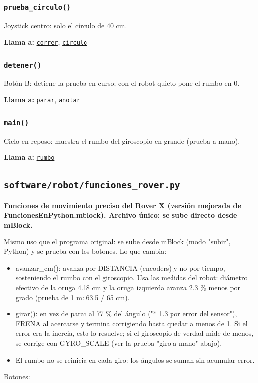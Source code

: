 \subsubsection{\texttt{prueba\_\allowbreak{}circulo()}}\label{fn:calibrations:prueba-circulo}
\noindent Joystick centro: solo el círculo de 40 cm.

\noindent\textbf{Llama a:} \hyperref[fn:calibrations:correr]{\texttt{correr}}, \hyperref[fn:calibrations:circulo]{\texttt{circulo}}\par

\subsubsection{\texttt{detener()}}\label{fn:calibrations:detener}
\noindent Botón B: detiene la prueba en curso; con el robot quieto pone el rumbo en 0.

\noindent\textbf{Llama a:} \hyperref[fn:calibrations:parar]{\texttt{parar}}, \hyperref[fn:calibrations:anotar]{\texttt{anotar}}\par

\subsubsection{\texttt{main()}}\label{fn:calibrations:main}
\noindent Ciclo en reposo: muestra el rumbo del giroscopio en grande (prueba a mano).

\noindent\textbf{Llama a:} \hyperref[fn:calibrations:rumbo]{\texttt{rumbo}}\par

\subsection{\texttt{software/robot/funciones\_\allowbreak{}rover.py}}\label{mod:funciones-rover}
\textbf{Funciones de movimiento preciso del Rover X (versión mejorada de FuncionesEnPython.mblock). Archivo único: se sube directo desde mBlock.}

Mismo uso que el programa original: se sube desde mBlock (modo "subir", Python) y se prueba con los botones. Lo que cambia:

\begin{itemize}\setlength\itemsep{0pt}
\item avanzar\_cm(): avanza por DISTANCIA (encoders) y no por tiempo, sosteniendo el rumbo con el giroscopio. Usa las medidas del robot: diámetro efectivo de la oruga 4.18 cm y la oruga izquierda avanza 2.3 \% menos por grado (prueba de 1 m: 63.5 / 65 cm).
\item girar(): en vez de parar al 77 \% del ángulo ("* 1.3 por error del sensor"), FRENA al acercarse y termina corrigiendo hasta quedar a menos de 1\textdegree{}. Si el error era la inercia, esto lo resuelve; si el giroscopio de verdad mide de menos, se corrige con GYRO\_SCALE (ver la prueba "giro a mano" abajo).
\item El rumbo no se reinicia en cada giro: los ángulos se suman sin acumular error.
\end{itemize}
Botones:

